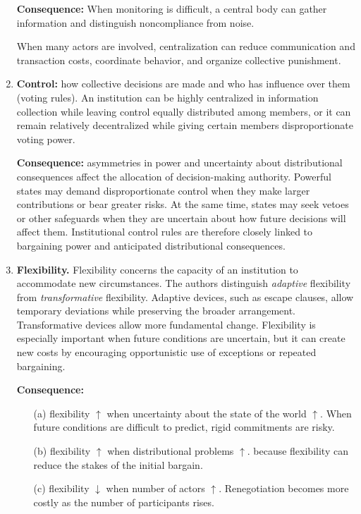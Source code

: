 \begin{enumerate}
    \textbf{Consequence:} When monitoring is difficult, a central body can gather information and distinguish noncompliance from noise.

    When many actors are involved, centralization can reduce communication and transaction costs, coordinate behavior, and organize collective punishment.

    \item \textbf{Control:} how collective decisions are made and who has influence over them (voting rules). An institution can be highly centralized in information collection while leaving control equally distributed among members, or it can remain relatively decentralized while giving certain members disproportionate voting power.

    \textbf{Consequence:} asymmetries in power and uncertainty about distributional consequences affect the allocation of decision-making authority. Powerful states may demand disproportionate control when they make larger contributions or bear greater risks. At the same time, states may seek vetoes or other safeguards when they are uncertain about how future decisions will affect them. Institutional control rules are therefore closely linked to bargaining power and anticipated distributional consequences.

    \item \textbf{Flexibility.} Flexibility concerns the capacity of an institution to accommodate new circumstances. The authors distinguish \emph{adaptive} flexibility from \emph{transformative} flexibility. Adaptive devices, such as escape clauses, allow temporary deviations while preserving the broader arrangement. Transformative devices allow more fundamental change. Flexibility is especially important when future conditions are uncertain, but it can create new costs by encouraging opportunistic use of exceptions or repeated bargaining.

    \textbf{Consequence:}
    \begin{itemize}
        \item [(a)] flexibility $\uparrow$ when uncertainty about the state of the world $\uparrow$. When future conditions are difficult to predict, rigid commitments are risky.
        \item [(b)] flexibility $\uparrow$ when distributional problems $\uparrow$. because flexibility can reduce the stakes of the initial bargain.
        \item [(c)] flexibility $\downarrow$ when number of actors $\uparrow$. Renegotiation becomes more costly as the number of participants rises.
    \end{itemize}
\end{enumerate}

